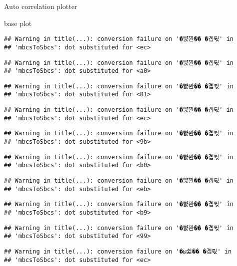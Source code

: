 \documentclass[ignorenonframetext,]{beamer}
\begin{document}
\begin{frame}[fragile]{Auto correlation plotter}
\begin{block}{base plot}
\begin{verbatim}
## Warning in title(...): conversion failure on '�뺤꽌�� �곕튃' in
## 'mbcsToSbcs': dot substituted for <ec>
\end{verbatim}

\begin{verbatim}
## Warning in title(...): conversion failure on '�뺤꽌�� �곕튃' in
## 'mbcsToSbcs': dot substituted for <a0>
\end{verbatim}

\begin{verbatim}
## Warning in title(...): conversion failure on '�뺤꽌�� �곕튃' in
## 'mbcsToSbcs': dot substituted for <81>
\end{verbatim}

\begin{verbatim}
## Warning in title(...): conversion failure on '�뺤꽌�� �곕튃' in
## 'mbcsToSbcs': dot substituted for <ec>
\end{verbatim}

\begin{verbatim}
## Warning in title(...): conversion failure on '�뺤꽌�� �곕튃' in
## 'mbcsToSbcs': dot substituted for <9b>
\end{verbatim}

\begin{verbatim}
## Warning in title(...): conversion failure on '�뺤꽌�� �곕튃' in
## 'mbcsToSbcs': dot substituted for <b0>
\end{verbatim}

\begin{verbatim}
## Warning in title(...): conversion failure on '�뺤꽌�� �곕튃' in
## 'mbcsToSbcs': dot substituted for <eb>
\end{verbatim}

\begin{verbatim}
## Warning in title(...): conversion failure on '�뺤꽌�� �곕튃' in
## 'mbcsToSbcs': dot substituted for <b9>
\end{verbatim}

\begin{verbatim}
## Warning in title(...): conversion failure on '�뺤꽌�� �곕튃' in
## 'mbcsToSbcs': dot substituted for <99>
\end{verbatim}

\begin{verbatim}
## Warning in title(...): conversion failure on '�ы쉶�� �곕튃' in
## 'mbcsToSbcs': dot substituted for <ec>
\end{verbatim}


\end{block}
\end{frame}
\end{document}

